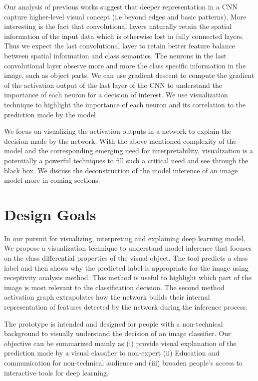 Our analysis of previous works suggest that deeper representation in a CNN capture higher-level visual concept (i.e beyond edges and basic patterns). More interesting is the fact that convolutional layers naturally retain the spatial information of the input data which is otherwise lost in fully connected layers. Thus we expect the last convolutional layer to retain better feature balance between spatial information and class semantics. The neurons in the last convolutional layer observe more and more the class specific information in the image, such as object parts. We can use gradient descent to compute the gradient of the activation output of the last layer of the CNN to understand the importance of each neuron for a decision of interest. We use visualization technique to highlight the importance of each neuron and its correlation to the prediction made by the model

We focus on visualizing the activation outputs in a network to explain the decision made by the network. With the above mentioned complexity of the model and the corresponding emerging need for interpretability, visualization is a potentially a powerful techniques to fill such a critical need and see through the black box. We discuss the deconstruction of the model inference of an image model more in coming sections.

\section{Design Goals}

In our pursuit for visualizing, interpreting and explaining deep learning model, We propose a visualization technique to understand model inference that focuses on the class differential properties of the visual object. The tool predicts a class label and then shows why the predicted label is appropriate for the image using receptivity analysis method. This method is useful to highlight which part of the image is most relevant to the classification decision. The second method activation graph extrapolates how the network builds their internal representation of  features detected by the network during the inference process.

The prototype is intended and designed for people with a non-technical background to visually understand the decision of an image classifier. Our objective can be summarized mainly as (i) provide visual explanation of the prediction made by a visual classifier to non-expert (ii) Education and communication for non-technical audience and (iii) broaden people's access to interactive tools for deep learning.

